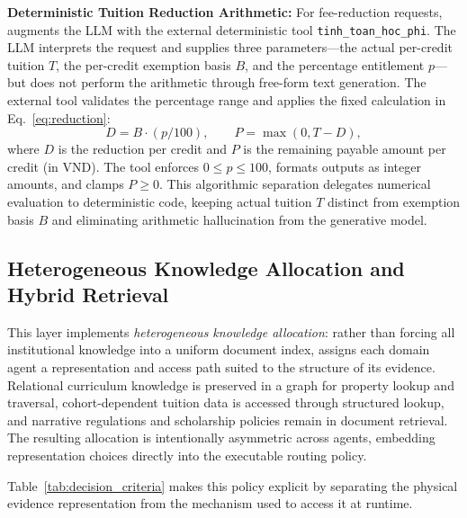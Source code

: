 \textbf{Deterministic Tuition Reduction Arithmetic:}
For fee-reduction requests, \system{} augments the LLM with the external deterministic tool \texttt{tinh\_toan\_hoc\_phi}. The LLM interprets the request and supplies three parameters---the actual per-credit tuition $T$, the per-credit exemption basis $B$, and the percentage entitlement $p$---but does not perform the arithmetic through free-form text generation. The external tool validates the percentage range and applies the fixed calculation in Eq.~\eqref{eq:reduction}:
\begin{equation}
  D = B \cdot (p / 100), \qquad P = \max(0, T - D), \label{eq:reduction}
\end{equation}
where $D$ is the reduction per credit and $P$ is the remaining payable amount per credit (in VND). The tool enforces $0 \le p \le 100$, formats outputs as integer amounts, and clamps $P \ge 0$. This algorithmic separation delegates numerical evaluation to deterministic code, keeping actual tuition $T$ distinct from exemption basis $B$ and eliminating arithmetic hallucination from the generative model.

\subsection{Heterogeneous Knowledge Allocation and Hybrid Retrieval}
\label{sec:hybrid_retrieval}

This layer implements \emph{heterogeneous knowledge allocation}: rather than forcing all institutional knowledge into a uniform document index, \system{} assigns each domain agent a representation and access path suited to the structure of its evidence. Relational curriculum knowledge is preserved in a graph for property lookup and traversal, cohort-dependent tuition data is accessed through structured lookup, and narrative regulations and scholarship policies remain in document retrieval. The resulting allocation is intentionally asymmetric across agents, embedding representation choices directly into the executable routing policy.

Table~\ref{tab:decision_criteria} makes this policy explicit by separating the physical evidence representation from the mechanism used to access it at runtime.

